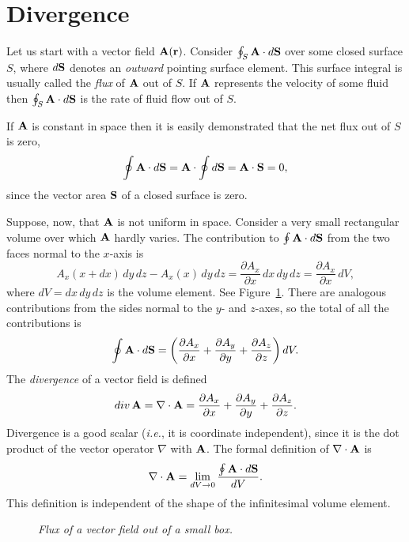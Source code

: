 \section{Divergence}\label{sdiv}
Let us start with a vector field ${\bf A}({\bf r})$. Consider $\oint_S {\bf A}\cdot
d{\bf S}$ over some closed surface $S$, where $d{\bf S}$ denotes an {\em outward}
pointing surface element. This surface integral is usually called the
{\em flux} of ${\bf A}$ out of $S$. If ${\bf A}$ represents the velocity of some fluid
then $\oint_S {\bf A}\cdot d{\bf S}$ is the rate of fluid flow out of $S$. 

If ${\bf A}$ is constant in space then it is easily demonstrated that the net
flux out of $S$ is zero,
\begin{equation}
\oint {\bf A}\cdot d{\bf S} = {\bf A}\cdot \oint d{\bf S} = {\bf A} \cdot {\bf S}=0,
\end{equation}
since the vector area ${\bf S}$ of a closed surface is zero.

Suppose, now, that ${\bf A}$ is not uniform in space. Consider a very small 
rectangular volume over which ${\bf A}$ hardly varies. The contribution to
$\oint {\bf A}\cdot d{\bf S}$ from the two faces normal to the $x$-axis is
\begin{equation}
A_x(x+dx) \,dy\,dz - A_x(x)\, dy\,dz = \frac{\partial A_x}{\partial x}\,dx\,dy\,dz
=  \frac{\partial A_x}{\partial x}\,dV,
\end{equation}
where $dV= dx\,dy\,dz$ is the volume element. See Figure~\ref{f17}.
There are analogous contributions
from the sides normal to the $y$- and $z$-axes, so the total of all the contributions
 is
\begin{equation}\label{e2121}
\oint {\bf A}\cdot d{\bf S} = \left(\frac{\partial A_x}{\partial x}+
\frac{\partial A_y}{\partial y}+\frac{\partial A_z}{\partial z}\right)dV.
\end{equation}
The {\em divergence} of a vector field is defined
\begin{equation}
{\mit div}\,{\bf A} = \nabla\cdot {\bf A} = \frac{\partial A_x}{\partial x}
+\frac{\partial A_y}{\partial y}+\frac{\partial A_z}{\partial z}.
\end{equation}
Divergence  is a good scalar ({\em i.e.}, it is coordinate
 independent), 
since it is the dot product of
the vector operator $\nabla$ with ${\bf A}$. The formal definition of
$\nabla\cdot{\bf A}$ is
\begin{equation}
\nabla\cdot{\bf A} = \lim_{dV\rightarrow 0} \frac{\oint {\bf A}\cdot d{\bf S}}
{dV}.
\end{equation} 
This definition is independent of the shape of the  infinitesimal volume
element. 
\begin{figure}
\epsfysize=2in
\centerline{}
\caption{\em Flux of a vector field out of a small box.}\label{f17}
\end{figure}

